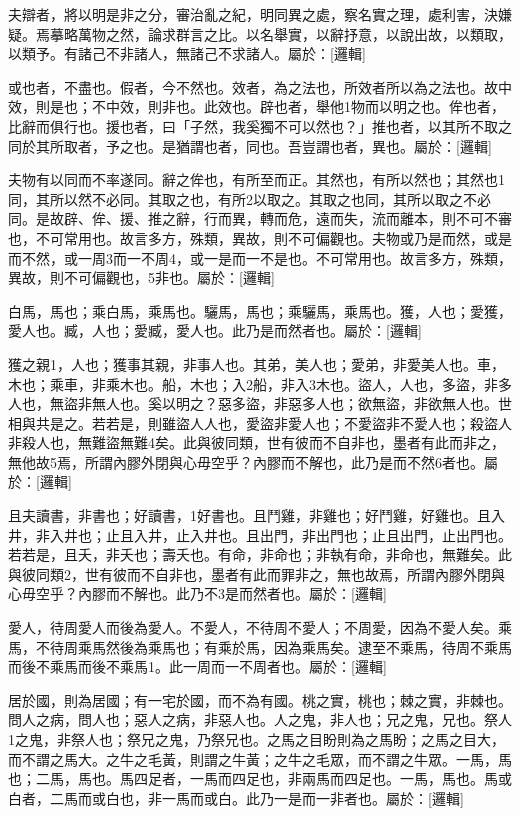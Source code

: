 
\begin{pinyinscope}
夫辯者，將以明是非之分，審治亂之紀，明同異之處，察名實之理，處利害，決嫌疑。焉摹略萬物之然，論求群言之比。以名舉實，以辭抒意，以說出故，以類取，以類予。有諸己不非諸人，無諸己不求諸人。屬於：[邏輯]

或也者，不盡也。假者，今不然也。效者，為之法也，所效者所以為之法也。故中效，則是也；不中效，則非也。此效也。辟也者，舉他1物而以明之也。侔也者，比辭而俱行也。援也者，曰「子然，我奚獨不可以然也？」推也者，以其所不取之同於其所取者，予之也。是猶謂也者，同也。吾豈謂也者，異也。屬於：[邏輯]

夫物有以同而不率遂同。辭之侔也，有所至而正。其然也，有所以然也；其然也1同，其所以然不必同。其取之也，有所2以取之。其取之也同，其所以取之不必同。是故辟、侔、援、推之辭，行而異，轉而危，遠而失，流而離本，則不可不審也，不可常用也。故言多方，殊類，異故，則不可偏觀也。夫物或乃是而然，或是而不然，或一周3而一不周4，或一是而一不是也。不可常用也。故言多方，殊類，異故，則不可偏觀也，5非也。屬於：[邏輯]

白馬，馬也；乘白馬，乘馬也。驪馬，馬也；乘驪馬，乘馬也。獲，人也；愛獲，愛人也。臧，人也；愛臧，愛人也。此乃是而然者也。屬於：[邏輯]

獲之親1，人也；獲事其親，非事人也。其弟，美人也；愛弟，非愛美人也。車，木也；乘車，非乘木也。船，木也；入2船，非入3木也。盜人，人也，多盜，非多人也，無盜非無人也。奚以明之？惡多盜，非惡多人也；欲無盜，非欲無人也。世相與共是之。若若是，則雖盜人人也，愛盜非愛人也；不愛盜非不愛人也；殺盜人非殺人也，無難盜無難4矣。此與彼同類，世有彼而不自非也，墨者有此而非之，無他故5焉，所謂內膠外閉與心毋空乎？內膠而不解也，此乃是而不然6者也。屬於：[邏輯]

且夫讀書，非書也；好讀書，1好書也。且鬥雞，非雞也；好鬥雞，好雞也。且入井，非入井也；止且入井，止入井也。且出門，非出門也；止且出門，止出門也。若若是，且夭，非夭也；壽夭也。有命，非命也；非執有命，非命也，無難矣。此與彼同類2，世有彼而不自非也，墨者有此而罪非之，無也故焉，所謂內膠外閉與心毋空乎？內膠而不解也。此乃不3是而然者也。屬於：[邏輯]

愛人，待周愛人而後為愛人。不愛人，不待周不愛人；不周愛，因為不愛人矣。乘馬，不待周乘馬然後為乘馬也；有乘於馬，因為乘馬矣。逮至不乘馬，待周不乘馬而後不乘馬而後不乘馬1。此一周而一不周者也。屬於：[邏輯]

居於國，則為居國；有一宅於國，而不為有國。桃之實，桃也；棘之實，非棘也。問人之病，問人也；惡人之病，非惡人也。人之鬼，非人也；兄之鬼，兄也。祭人1之鬼，非祭人也；祭兄之鬼，乃祭兄也。之馬之目盼則為之馬盼；之馬之目大，而不謂之馬大。之牛之毛黃，則謂之牛黃；之牛之毛眾，而不謂之牛眾。一馬，馬也；二馬，馬也。馬四足者，一馬而四足也，非兩馬而四足也。一馬，馬也。馬或白者，二馬而或白也，非一馬而或白。此乃一是而一非者也。屬於：[邏輯]


\end{pinyinscope}